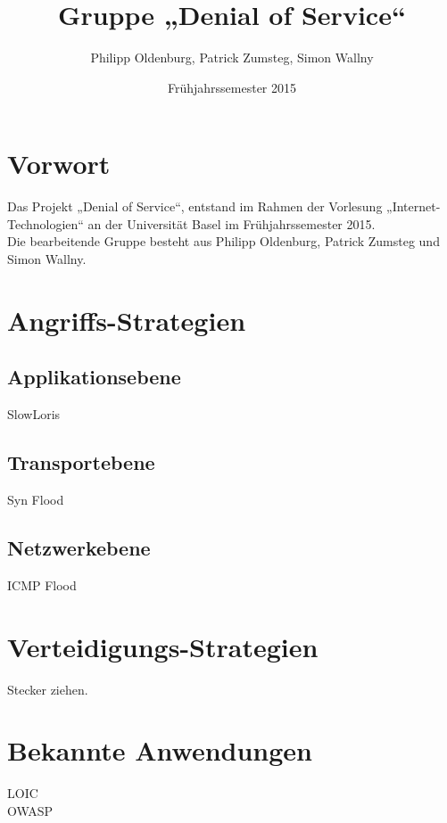 \documentclass[12pt,a4paper]{article}
\author{Philipp Oldenburg, Patrick Zumsteg, Simon Wallny}
\title{Gruppe „Denial of Service“}
\date{Frühjahrssemester 2015}
\begin{document}
\maketitle
\tableofcontents
\section{Vorwort}
Das Projekt „Denial of Service“, entstand im Rahmen der Vorlesung „Internet-Technologien“ an der Universität Basel im Frühjahrssemester 2015.\hfill\\
Die bearbeitende Gruppe besteht aus Philipp Oldenburg, Patrick Zumsteg und Simon Wallny.
\newpage
\section{Angriffs-Strategien}
\subsection{Applikationsebene}
SlowLoris
\subsection{Transportebene}
Syn Flood
\subsection*{Netzwerkebene}
ICMP Flood
\section{Verteidigungs-Strategien}
Stecker ziehen.
\section{Bekannte Anwendungen}
LOIC\\
OWASP
\end{document}
